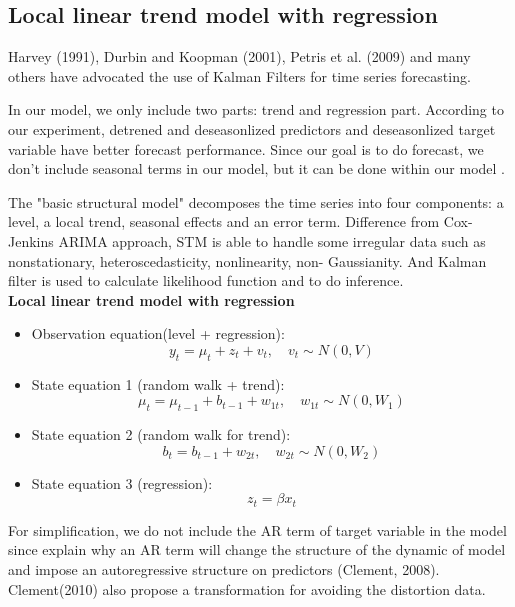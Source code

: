 \subsection{Local linear trend model with regression}


Harvey (1991), Durbin and Koopman (2001), Petris et al. (2009) and many others have advocated the use of Kalman Filters for time series forecasting.


In our model, we only include two parts: trend and regression part. According to our experiment, detrened and deseasonlized predictors and deseasonlized target variable have better forecast performance. Since our goal is to do forecast, we don't include seasonal terms in our model, but it can be done within our model \cite{Scott2014a}. 


The "basic structural model" decomposes the time series into four components: a level, a local trend, seasonal effects and an error term. Difference from Cox-Jenkins ARIMA approach, STM is able to handle some irregular data such as nonstationary, heteroscedasticity, nonlinearity, non- Gaussianity. And Kalman filter is used to calculate likelihood function and to do inference.\\


\textbf{Local linear trend model with regression}


\begin{itemize}
	\item {Observation equation(level + regression): $$y_t = \mu_t + z_t + v_{t}, \quad v_{t} \sim N(0, V)$$}
	
	\item {State equation 1 (random walk + trend): $$\mu_t = \mu_{t-1} + b_{t-1} + w_{1t}, \quad w_{1t} \sim N(0, W_{1})$$}
	
	\item {State equation 2 (random walk for trend): $$b_t = b_{t-1} + w_{2t}, \quad w_{2t} \sim N(0, W_{2})$$}
	
	
	\item {State equation 3 (regression): $$z_t = \beta x_t$$}
	
\end{itemize}



For simplification, we do not include the AR term of target variable in the model since  
explain why an AR term will change the structure of the dynamic of model and impose an autoregressive structure on predictors (Clement, 2008). Clement(2010) also propose a transformation for avoiding the distortion data. 


